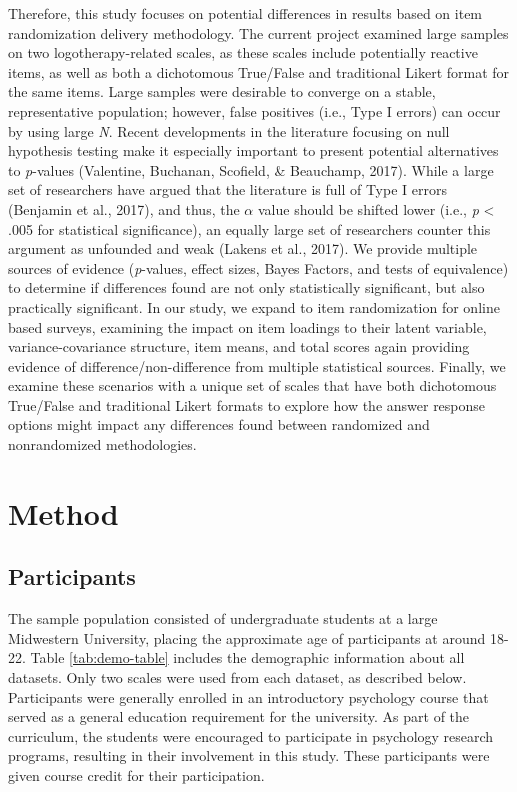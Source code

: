 \documentclass[english,man, mask]{apa6}
\theoremstyle{definition}
\theoremstyle{definition}
\theoremstyle{definition}
\theoremstyle{remark}
\begin{document}
Therefore, this study focuses on potential differences in results based
on item randomization delivery methodology. The current project examined
large samples on two logotherapy-related scales, as these scales include
potentially reactive items, as well as both a dichotomous True/False and
traditional Likert format for the same items. Large samples were
desirable to converge on a stable, representative population; however,
false positives (i.e., Type I errors) can occur by using large \emph{N}.
Recent developments in the literature focusing on null hypothesis
testing make it especially important to present potential alternatives
to \emph{p}-values (Valentine, Buchanan, Scofield, \& Beauchamp, 2017).
While a large set of researchers have argued that the literature is full
of Type I errors (Benjamin et al., 2017), and thus, the \(\alpha\) value
should be shifted lower (i.e., \emph{p} \textless{} .005 for statistical
significance), an equally large set of researchers counter this argument
as unfounded and weak (Lakens et al., 2017). We provide multiple sources
of evidence (\emph{p}-values, effect sizes, Bayes Factors, and tests of
equivalence) to determine if differences found are not only
statistically significant, but also practically significant. In our
study, we expand to item randomization for online based surveys,
examining the impact on item loadings to their latent variable,
variance-covariance structure, item means, and total scores again
providing evidence of difference/non-difference from multiple
statistical sources. Finally, we examine these scenarios with a unique
set of scales that have both dichotomous True/False and traditional
Likert formats to explore how the answer response options might impact
any differences found between randomized and nonrandomized
methodologies.

\section{Method}\label{method}

\subsection{Participants}\label{participants}

The sample population consisted of undergraduate students at a large
Midwestern University, placing the approximate age of participants at
around 18-22. Table \ref{tab:demo-table} includes the demographic
information about all datasets. Only two scales were used from each
dataset, as described below. Participants were generally enrolled in an
introductory psychology course that served as a general education
requirement for the university. As part of the curriculum, the students
were encouraged to participate in psychology research programs,
resulting in their involvement in this study. These participants were
given course credit for their participation.
\end{document}
